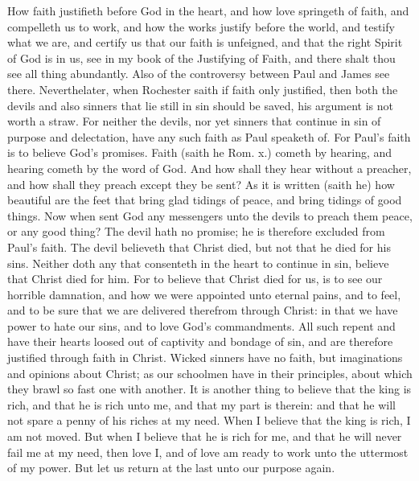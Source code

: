 How faith justifieth before God in the heart, and how 
love springeth of faith, and compelleth us to work, and 
how the works justify before the world, and testify what 
we are, and certify us that our faith is unfeigned, and that 
the right Spirit of God is in us, see in my book of the Justifying
of Faith, and there shalt thou see all thing abundantly.
Also of the controversy between Paul and 
James see there. Neverthelater, when Rochester saith 
if faith only justified, then both the devils and also 
sinners that lie still in sin should be saved, his argument is 
not worth a straw. For neither the devils, nor yet sinners 
that continue in sin of purpose and delectation, have any 
such faith as Paul speaketh of. For Paul's faith is to 
believe God's promises. Faith (saith he Rom. x.) cometh 
by hearing, and hearing cometh by the word of God. 
And how shall they hear without a preacher, and how shall 
they preach except they be sent? As it is written (saith 
he) how beautiful are the feet that bring glad tidings of 
peace, and bring tidings of good things. Now when 
sent God any messengers unto the devils to preach them 
peace, or any good thing? The devil hath no promise; 
he is therefore excluded from Paul's faith. The devil 
believeth that Christ died, but not that he died for his sins. 
Neither doth any that consenteth in the heart to continue 
in sin, believe that Christ died for him. For to believe 
that Christ died for us, is to see our horrible damnation, 
and how we were appointed unto eternal pains, and to feel, 
and to be sure that we are delivered therefrom through 
Christ: in that we have power to hate our sins, and to 
love God's commandments. All such repent and have 
their hearts loosed out of captivity and bondage of sin, 
and are therefore justified through faith in Christ. Wicked 
sinners have no faith, but imaginations and opinions about 
Christ; as our schoolmen have in their principles, about 
which they brawl so fast one with another. It is another 
thing to believe that the king is rich, and that he is rich 
unto me, and that my part is therein: and that he will not 
spare a penny of his riches at my need. When I believe that 
the king is rich, I am not moved. But when I believe 
that he is rich for me, and that he will never fail me at my 
need, then love I, and of love am ready to work unto the 
uttermost of my power. But let us return at the last 
unto our purpose again. 

